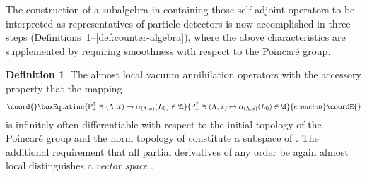 \documentclass[a4paper,a4paper]{article}
\numberwithin{equation}{section}
\providecommand{\Afrak}{\mathfrak{A}}
\providecommand{\Cfrak}{\mathfrak{C}}
\providecommand{\Lfrak}{\mathfrak{L}}
\providecommand{\AS}{\mathfrak{A}_{\mathscr{S}}}
\providecommand{\Aann}{\mathfrak{A}_{\text{\itshape ann}}}
\providecommand{\Poin}{\mathsf{P}_{\negthinspace +}^\uparrow}
\providecommand{\aLax}{\alpha_{( \Lambda , x )}}
\theoremstyle{definition}
\newtheorem{definition}{Definition}[section]
\theoremstyle{plain}
\theoremstyle{remark}
\begin{document}
  The construction of a subalgebra \myHighlight{$\Cfrak$}\coordHE{} in \myHighlight{$\Afrak$}\coordHE{} containing
  those self-adjoint operators to be interpreted as representatives of
  particle detectors is now accomplished in three steps
  (Definitions~\ref{def:annihilator-space}--\ref{def:counter-algebra}),
  where the above characteristics are supplemented by requiring
  smoothness with respect to the Poincar\'e group.
  \begin{definition}
    \label{def:annihilator-space}
    The almost local vacuum annihilation operators \coordHE{} with the
    accessory property that the mapping
    \begin{equation}\coord{}\boxEquation{
      \label{eq:operator-differentiability}
      \Poin \ni ( \Lambda , x ) \mapsto \aLax ( L_0 ) \in \Afrak
    }{
      \Poin \ni ( \Lambda , x ) \mapsto \aLax ( L_0 ) \in \Afrak
    }{ecuacion}\coordE{}\end{equation}
    is infinitely often differentiable with respect to the initial
    topology of the Poincar\'e group \myHighlight{$\Poin$}\coordHE{} and the norm topology of
    \myHighlight{$\Afrak$}\coordHE{} constitute a subspace of \myHighlight{$\AS \cap \Aann$}\coordHE{}. The additional
    requirement that all partial derivatives of any order be again
    almost local distinguishes a \emph{vector space} \myHighlight{$\Lfrak_0
    \subset \Afrak$}\coordHE{}.
  \end{definition}
\end{document}
